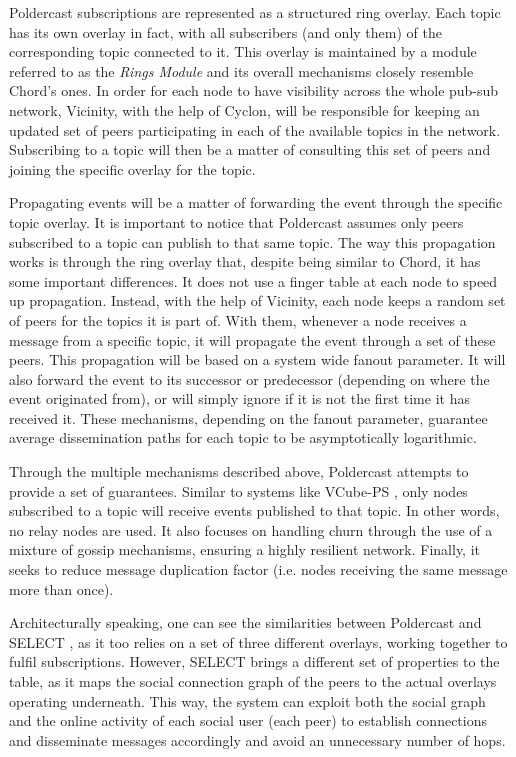 Poldercast subscriptions are represented as a structured ring overlay.
Each topic has its own overlay in fact, with all subscribers (and only
them) of the corresponding topic connected to it. This overlay is
maintained by a module referred to as the \emph{Rings Module} and its
overall mechanisms closely resemble Chord's ones. In order for each node
to have visibility across the whole pub-sub network, Vicinity, with the
help of Cyclon, will be responsible for keeping an updated set of peers
participating in each of the available topics in the network.
Subscribing to a topic will then be a matter of consulting this set of
peers and joining the specific overlay for the topic.

Propagating events will be a matter of forwarding the event through the
specific topic overlay. It is important to notice that Poldercast
assumes only peers subscribed to a topic can publish to that same topic.
The way this propagation works is through the ring overlay that, despite
being similar to Chord, it has some important differences. It does not
use a finger table at each node to speed up propagation. Instead, with
the help of Vicinity, each node keeps a random set of peers for the
topics it is part of. With them, whenever a node receives a message from
a specific topic, it will propagate the event through a set of these
peers. This propagation will be based on a system wide fanout parameter.
It will also forward the event to its successor or predecessor
(depending on where the event originated from), or will simply ignore if it
is not the first time it has received it. These mechanisms, depending on
the fanout parameter, guarantee average dissemination paths for each
topic to be asymptotically logarithmic.

Through the multiple mechanisms described above, Poldercast attempts to provide
a set of guarantees. Similar to systems like VCube-PS
\cite{DeAraujo2017}, only nodes subscribed to a topic will receive events
published to that topic. In other words, no relay nodes are used. It also
focuses on handling churn through the use of a mixture of gossip mechanisms,
ensuring a highly resilient network.  Finally, it seeks to reduce message
duplication factor (i.e. nodes receiving the same message more than once).

Architecturally speaking, one can see the similarities between Poldercast and
SELECT \cite{Apolonia2018}, as it too relies on a set of three different
overlays, working together to fulfil subscriptions. However, SELECT brings a
different set of properties to the table, as it maps the social connection
graph of the peers to the actual overlays operating underneath. This way, the
system can exploit both the social graph and the online activity of each social
user (each peer) to establish connections and disseminate messages accordingly
and avoid an unnecessary number of hops.

